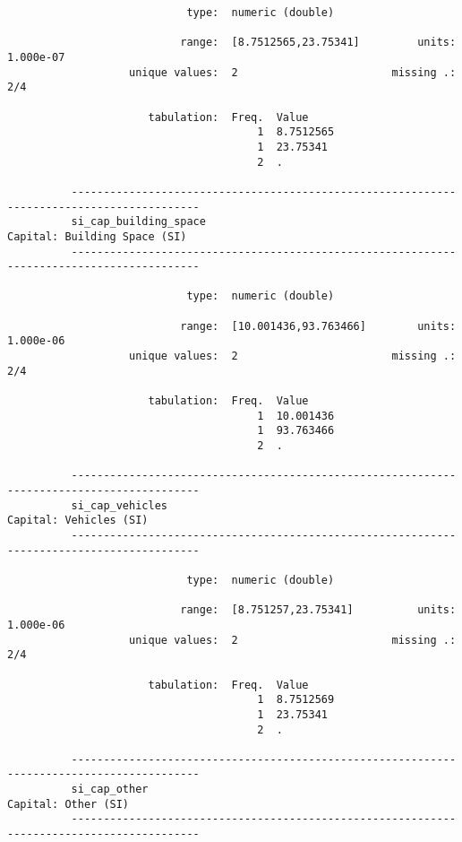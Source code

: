 \documentclass{article}
\begin{document}
\begin{verbatim}
                            type:  numeric (double)
          
                           range:  [8.7512565,23.75341]         units:  1.000e-07
                   unique values:  2                        missing .:  2/4
          
                      tabulation:  Freq.  Value
                                       1  8.7512565
                                       1  23.75341
                                       2  .
          
          ------------------------------------------------------------------------------------------
          si_cap_building_space                                         Capital: Building Space (SI)
          ------------------------------------------------------------------------------------------
          
                            type:  numeric (double)
          
                           range:  [10.001436,93.763466]        units:  1.000e-06
                   unique values:  2                        missing .:  2/4
          
                      tabulation:  Freq.  Value
                                       1  10.001436
                                       1  93.763466
                                       2  .
          
          ------------------------------------------------------------------------------------------
          si_cap_vehicles                                                     Capital: Vehicles (SI)
          ------------------------------------------------------------------------------------------
          
                            type:  numeric (double)
          
                           range:  [8.751257,23.75341]          units:  1.000e-06
                   unique values:  2                        missing .:  2/4
          
                      tabulation:  Freq.  Value
                                       1  8.7512569
                                       1  23.75341
                                       2  .
          
          ------------------------------------------------------------------------------------------
          si_cap_other                                                           Capital: Other (SI)
          ------------------------------------------------------------------------------------------
          

\end{verbatim}
\end{document}
